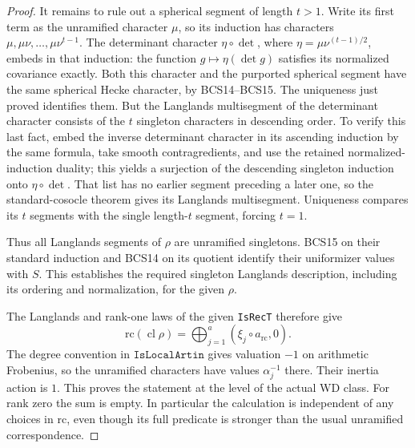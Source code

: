 \begin{proof}
It remains to rule out a spherical segment of length
$t>1$.  Write its first term as the unramified character
$\mu$, so its induction has characters
$\mu,\mu\nu,\ldots,\mu\nu^{t-1}$.  The determinant
character $\eta\circ\det$, where
$\eta=\mu\nu^{(t-1)/2}$, embeds in that induction:
the function $g\mapsto\eta(\det g)$ satisfies its
normalized covariance exactly.  Both this character
and the purported spherical segment have the same
spherical Hecke character, by BCS14--BCS15.  The
uniqueness just proved identifies them.  But the
Langlands multisegment of the determinant character
consists of the $t$ singleton characters in descending
order.  To verify this last fact, embed the inverse
determinant character in its ascending induction by
the same formula, take smooth contragredients, and use
the retained normalized-induction duality; this yields
a surjection of the descending singleton induction
onto $\eta\circ\det$.  That list has no earlier
segment preceding a later one, so the standard-cosocle
theorem gives its Langlands multisegment.  Uniqueness
compares its $t$ segments with the single length-$t$
segment, forcing $t=1$.

Thus all Langlands segments of $\rho$ are unramified
singletons.  BCS15 on their standard induction and
BCS14 on its quotient identify their uniformizer values
with $S$.  This establishes the required singleton
Langlands description, including its ordering and
normalization, for the given $\rho$.

The Langlands and rank-one laws of the given
\texttt{IsRecT} therefore give
\[
          \mathrm{rc}(\operatorname{cl}\rho)
                     =\bigoplus_{j=1}^a(\xi_j\circ a_{\mathrm{rc}},0).
\]
The degree convention in $\texttt{IsLocalArtin}$
gives valuation $-1$ on arithmetic Frobenius, so the
unramified characters have values $\alpha_j^{-1}$
there.  Their inertia action is $1$.  This proves
the statement at the level of the actual WD class.
For rank zero the sum is empty.  In particular the
calculation is independent of any choices in
$\mathrm{rc}$, even though its full predicate is
stronger than the usual unramified correspondence.
\end{proof}

